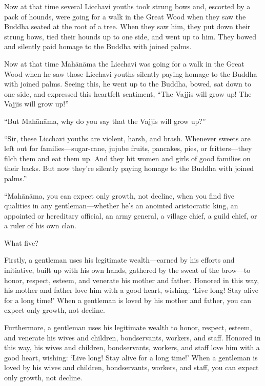 \documentclass[12pt,openany]{book}%
\begin{document}
Now at that time several Licchavi youths took strung bows and, escorted by a pack of hounds, were going for a walk in the Great Wood when they saw the Buddha seated at the root of a tree. When they saw him, they put down their strung bows, tied their hounds up to one side, and went up to him. They bowed and silently paid homage to the Buddha with joined palms. 

Now at that time \textsanskrit{Mahānāma} the Licchavi was going for a walk in the Great Wood when he saw those Licchavi youths silently paying homage to the Buddha with joined palms. Seeing this, he went up to the Buddha, bowed, sat down to one side, and expressed this heartfelt sentiment, “The Vajjis will grow up! The Vajjis will grow up!” 

“But \textsanskrit{Mahānāma}, why do you say that the Vajjis will grow up?” 

“Sir, these Licchavi youths are violent, harsh, and brash. Whenever sweets are left out for families—sugar-cane, jujube fruits, pancakes, pies, or fritters—they filch them and eat them up. And they hit women and girls of good families on their backs. But now they’re silently paying homage to the Buddha with joined palms.” 

“\textsanskrit{Mahānāma}, you can expect only growth, not decline, when you find five qualities in any gentleman—whether he’s an anointed aristocratic king, an appointed or hereditary official, an army general, a village chief, a guild chief, or a ruler of his own clan. 

What five? 

Firstly, a gentleman uses his legitimate wealth—earned by his efforts and initiative, built up with his own hands, gathered by the sweat of the brow—to honor, respect, esteem, and venerate his mother and father. Honored in this way, his mother and father love him with a good heart, wishing: ‘Live long! Stay alive for a long time!’ When a gentleman is loved by his mother and father, you can expect only growth, not decline. 

Furthermore, a gentleman uses his legitimate wealth to honor, respect, esteem, and venerate his wives and children, bondservants, workers, and staff. Honored in this way, his wives and children, bondservants, workers, and staff love him with a good heart, wishing: ‘Live long! Stay alive for a long time!’ When a gentleman is loved by his wives and children, bondservants, workers, and staff, you can expect only growth, not decline. 
\end{document}
